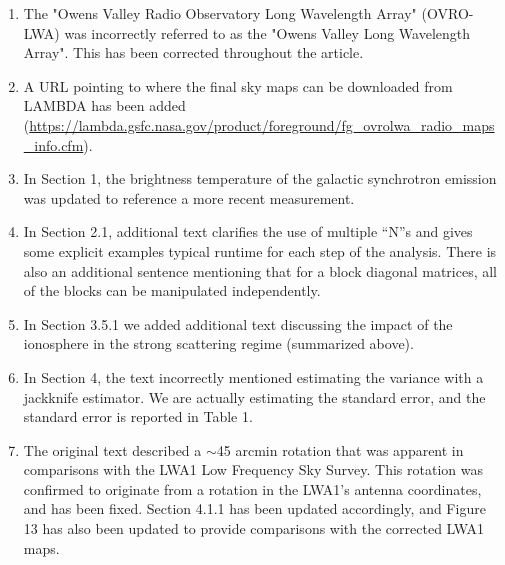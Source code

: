 \documentclass{article}
\begin{document}
\begin{enumerate}
    \item The "Owens Valley Radio Observatory Long Wavelength Array" (OVRO-LWA) was incorrectly
        referred to as the "Owens Valley Long Wavelength Array". This has been corrected throughout
        the article.

    \item A URL pointing to where the final sky maps can be downloaded from LAMBDA has been added
        (\url{https://lambda.gsfc.nasa.gov/product/foreground/fg_ovrolwa_radio_maps_info.cfm}).

    \item In Section 1, the brightness temperature of the galactic synchrotron emission was updated
        to reference a more recent measurement.

    \item In Section 2.1, additional text clarifies the use of multiple ``N''s and gives some
        explicit examples typical runtime for each step of the analysis. There is also an additional
        sentence mentioning that for a block diagonal matrices, all of the blocks can be manipulated
        independently.

    \item In Section 3.5.1 we added additional text discussing the impact of the ionosphere in the
        strong scattering regime (summarized above).

    \item In Section 4, the text incorrectly mentioned estimating the variance with a jackknife
        estimator.  We are actually estimating the standard error, and the standard error is
        reported in Table 1.

    \item The original text described a $\sim$45 arcmin rotation that was apparent in comparisons
        with the LWA1 Low Frequency Sky Survey. This rotation was confirmed to originate from a
        rotation in the LWA1's antenna coordinates, and has been fixed.  Section 4.1.1 has been
        updated accordingly, and Figure 13 has also been updated to provide comparisons with the
        corrected LWA1 maps.
\end{enumerate}
\end{document}
